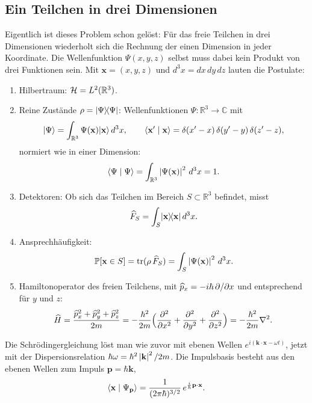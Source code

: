 \subsection{Ein Teilchen in drei Dimensionen}
Eigentlich ist dieses Problem schon gelöst: Für das freie Teilchen in drei Dimensionen wiederholt sich die Rechnung der einen Dimension in jeder Koordinate. Die Wellenfunktion $\Psi(x,y,z)$ selbst muss dabei kein Produkt von drei Funktionen sein. Mit $\mathbf{x} = (x,y,z)$ und $d^3x = dx\,dy\,dz$ lauten die Postulate:
\begin{enumerate}
	\item Hilbertraum: $\mathcal{H} = L^2(\mathbb{R}^3)$.
	\item Reine Zustände $\rho = \lvert \Psi \rangle\!\langle \Psi \rvert$: Wellenfunktionen $\Psi:\mathbb{R}^3\to\mathbb{C}$ mit
	\begin{equation}
		\lvert \Psi \rangle = \int_{\mathbb{R}^3} \Psi(\mathbf{x})\lvert \mathbf{x} \rangle\,d^3x, \qquad \langle \mathbf{x}' \mid \mathbf{x} \rangle = \delta(x'-x)\,\delta(y'-y)\,\delta(z'-z),
	\end{equation}
	normiert wie in einer Dimension:
	\begin{equation}
		\langle \Psi \mid \Psi \rangle = \int_{\mathbb{R}^3} \left\lvert \Psi(\mathbf{x}) \right\rvert^2\,d^3x = 1.
	\end{equation}
	\item Detektoren: Ob sich das Teilchen im Bereich $S\subset\mathbb{R}^3$ befindet, misst
	\begin{equation}
		\widehat{F}_S = \int_S \lvert \mathbf{x} \rangle\!\langle \mathbf{x} \rvert\,d^3x.
	\end{equation}
	\item Ansprechhäufigkeit:
	\begin{equation}
		\mathbb{P}[\mathbf{x}\in S] = \operatorname{tr}(\rho\,\widehat{F}_S) = \int_S \left\lvert \Psi(\mathbf{x}) \right\rvert^2\,d^3x.
	\end{equation}
	\item Hamiltonoperator des freien Teilchens, mit $\widehat{p}_x = -i\hbar\,\partial/\partial x$ und entsprechend für $y$ und $z$:
	\begin{equation}
		\widehat{H} = \frac{\widehat{p}_x^2 + \widehat{p}_y^2 + \widehat{p}_z^2}{2m} = -\frac{\hbar^2}{2m}\Bigl(\frac{\partial^2}{\partial x^2} + \frac{\partial^2}{\partial y^2} + \frac{\partial^2}{\partial z^2}\Bigr) = -\frac{\hbar^2}{2m}\nabla^2.
	\end{equation}
\end{enumerate}
Die Schrödingergleichung löst man wie zuvor mit ebenen Wellen $e^{i(\mathbf{k}\cdot\mathbf{x}-\omega t)}$, jetzt mit der Dispersionsrelation $\hbar\omega = \hbar^2\left\lvert \mathbf{k} \right\rvert^2/2m$. Die Impulsbasis besteht aus den ebenen Wellen zum Impuls $\mathbf{p} = \hbar\mathbf{k}$,
\begin{equation}
	\langle \mathbf{x} \mid \Psi_{\mathbf{p}} \rangle = \frac{1}{(2\pi\hbar)^{3/2}}\,e^{\frac{i}{\hbar}\mathbf{p}\cdot\mathbf{x}}.
\end{equation}

